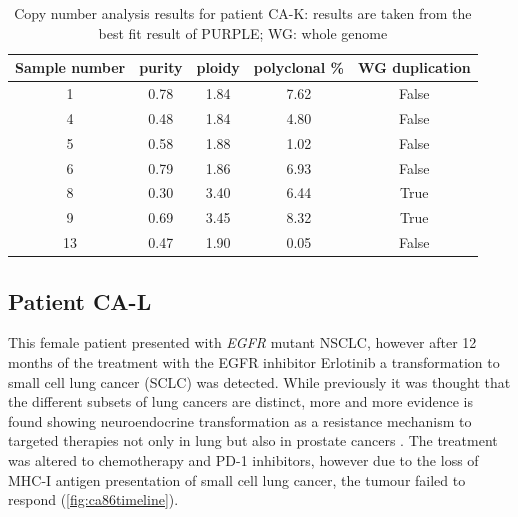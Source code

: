 \begin{table}[ht]
\caption[Copy number analysis results for patient CA-K]{Copy number analysis results for patient CA-K: results are taken from the best fit result of PURPLE; WG: whole genome}\label{tab:ca82cnv}
\centering
{}
\begin{tabular}{|c|c|c|c|c|}
\toprule
\hline
 \rowcolor{gray!50}
\textbf{Sample number} & \textbf{purity} & \textbf{ploidy} & \textbf{polyclonal \%} & \textbf{WG duplication}\\
\hline
 1 & \num{0.78} &	 \num{1.84} &	\num{7.62} & False	\\
 4 & \num{0.48} & \num{1.84} & \num{4.80} & False \\
 5 & \num{0.58} & \num{1.88} & \num{1.02} & False \\
 6 & \num{0.79} & \num{1.86} & \num{6.93} & False \\
 8 & \num{0.30} & \num{3.40} & \num{6.44} & True \\
 9 & \num{0.69} & \num{3.45} & \num{8.32} & True \\
 13 & \num{0.47} & \num{1.90} & \num{0.05} & False \\
 \hline
\bottomrule
\end{tabular}
\end{table} 


\cleardoublepage

\subsection{Patient CA-L}
\label{cascade-sec:CA86}

This  female patient presented with \textit{EGFR} mutant NSCLC, however after 12 months of the treatment with the EGFR inhibitor Erlotinib a transformation to small cell lung cancer (SCLC) was detected. While previously it was thought that the different subsets of lung cancers are distinct, more and more evidence is found showing neuroendocrine transformation as a resistance mechanism to targeted therapies not only in lung but also in prostate cancers \cite{Oser2015,Aggarwal2018}. The treatment was altered to chemotherapy and PD-1 inhibitors, however due to the loss of MHC-I antigen presentation of small cell lung cancer, the tumour failed to respond \cite{Burr2019} (\autoref{fig:ca86timeline}).

